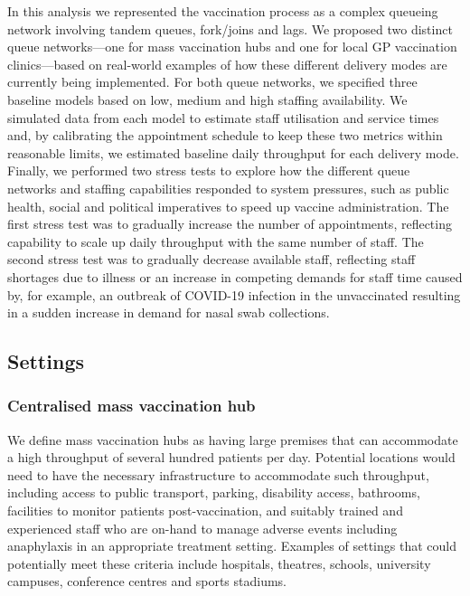 \documentclass{article}
\begin{document}
In this analysis we represented the vaccination process as a complex
queueing network involving tandem queues, fork/joins and lags. We
proposed two distinct queue networks---one for mass vaccination hubs and
one for local GP vaccination clinics---based on real-world examples of
how these different delivery modes are currently being implemented. For
both queue networks, we specified three baseline models based on low,
medium and high staffing availability. We simulated data from each model
to estimate staff utilisation and service times and, by calibrating the
appointment schedule to keep these two metrics within reasonable limits,
we estimated baseline daily throughput for each delivery mode. Finally,
we performed two stress tests to explore how the different queue
networks and staffing capabilities responded to system pressures, such
as public health, social and political imperatives to speed up vaccine
administration. The first stress test was to gradually increase the
number of appointments, reflecting capability to scale up daily
throughput with the same number of staff. The second stress test was to
gradually decrease available staff, reflecting staff shortages due to
illness or an increase in competing demands for staff time caused by,
for example, an outbreak of COVID-19 infection in the unvaccinated
resulting in a sudden increase in demand for nasal swab collections.

\hypertarget{settings}{%
\subsection{Settings}\label{settings}}

\hypertarget{centralised-mass-vaccination-hub}{%
\subsubsection{Centralised mass vaccination
hub}\label{centralised-mass-vaccination-hub}}

We define mass vaccination hubs as having large premises that can
accommodate a high throughput of several hundred patients per day.
Potential locations would need to have the necessary infrastructure to
accommodate such throughput, including access to public transport,
parking, disability access, bathrooms, facilities to monitor patients
post-vaccination, and suitably trained and experienced staff who are
on-hand to manage adverse events including anaphylaxis in an appropriate
treatment setting. Examples of settings that could potentially meet
these criteria include hospitals, theatres, schools, university
campuses, conference centres and sports stadiums.
\end{document}
